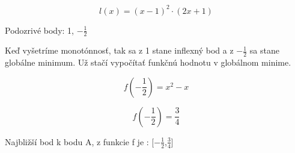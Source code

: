 \begin{displaymath}
l(x)=(x-1)^2\cdot (2x +1)
\end{displaymath}

Podozrivé body: 1, \(-\frac{1}{2}\)

Keď vyšetríme monotónnosť, tak sa z 1 stane inflexný bod a z \(-\frac{1}{2}\) sa stane globálne minimum.
Už stačí vypočítať funkčnú hodnotu v globálnom minime.

\begin{displaymath}
f(-\frac{1}{2})= x^2 - x
\end{displaymath}

\begin{displaymath}
f(-\frac{1}{2})= \frac{3}{4}
\end{displaymath}

Najbližší bod k bodu A, z funkcie f je : [\(-\frac{1}{2}\),\(\frac{3}{4}\)]